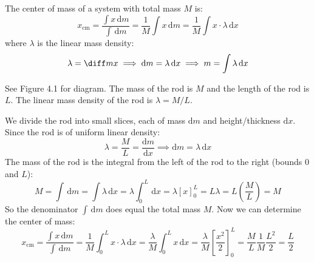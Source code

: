 \documentclass{article}
\newcommand{\theorem}[2]{\begin{tcolorbox}[title={#1},colback=blue!5!white,colframe=blue!75!black,parbox=false] #2 \end{tcolorbox}}
\newcommand{\example}[2]{\begin{tcolorbox}[title={Example: #1},colback=brown!5!white,colframe=brown!75!black,parbox=false] #2 \end{tcolorbox}}
\begin{document}
\theorem{Generalized center of mass}{
	The center of mass of a system with total mass $M$ is:
	\begin{equation*}
		x_\text{cm}=\frac{\int x\,\mathrm{d}m}{\int \,\mathrm{d}m}=\frac1M\int x\,\mathrm{d}m=\frac1M \int x\cdot\lambda\,\mathrm{d}x
	\end{equation*}
	where $\lambda$ is the linear mass density:
	\begin{equation*}
		\lambda = \diff mx
		\implies \mathrm{d}m=\lambda \,\mathrm{d}x
		\implies m=\int \lambda\,\mathrm{d}x
	\end{equation*}
}

\example{Rod with uniform linear density}{
	See Figure 4.1 for diagram. The mass of the rod is $M$ and the length of the rod is $L$. The linear mass density of the rod is $\lambda=M/L$.

	We divide the rod into small slices, each of mass $\mathrm{d}m$ and height/thickness $\mathrm{d}x$. Since the rod is of uniform linear density:
	\begin{equation*}
	    \lambda=\frac{M}{L}=\frac{\mathrm{d}m}{\mathrm{d}x}
		\implies \boxed{\mathrm{d}m=\lambda \,\mathrm{d}x}
	\end{equation*}
	The mass of the rod is the integral from the left of the rod to the right (bounds $0$ and $L$):
	\begin{equation*}
	    M=\int \,\mathrm{d}m=\int \lambda\,\mathrm{d}x=\lambda \int_{0}^{L}\,\mathrm{d}x
		=\lambda \left[x\right]_{0}^{L}
		=L\lambda
		=L \left( \frac ML \right)
		=M
	\end{equation*}
	So the denominator $\int \,\mathrm{d}m$ does equal the total mass $M$. Now we can determine the center of mass:
	\begin{equation*}
	    x_ \text{cm}
		=\frac{\int x\,\mathrm{d}m}{\int \,\mathrm{d}m}
		=\frac1M \int_{0}^{L}x\cdot\lambda\,\mathrm{d}x
		=\frac{\lambda}{M}\int_{0}^{L}x\,\mathrm{d}x
		=\frac{\lambda}{M} \left[\frac{x^2}{2}\right]_{0}^{L}
		=\frac ML \frac 1M \frac{L^2}{2}
		=\frac{L}{2}
	\end{equation*}
}
\end{document}
